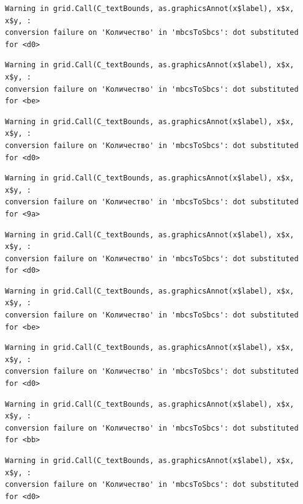 \documentclass[
  letterpaper,
  DIV=11,
  numbers=noendperiod]{scrreprt}
\theoremstyle{definition}
\theoremstyle{remark}
\begin{document}
\begin{verbatim}
Warning in grid.Call(C_textBounds, as.graphicsAnnot(x$label), x$x, x$y, :
conversion failure on 'Количество' in 'mbcsToSbcs': dot substituted for <d0>
\end{verbatim}

\begin{verbatim}
Warning in grid.Call(C_textBounds, as.graphicsAnnot(x$label), x$x, x$y, :
conversion failure on 'Количество' in 'mbcsToSbcs': dot substituted for <be>
\end{verbatim}

\begin{verbatim}
Warning in grid.Call(C_textBounds, as.graphicsAnnot(x$label), x$x, x$y, :
conversion failure on 'Количество' in 'mbcsToSbcs': dot substituted for <d0>
\end{verbatim}

\begin{verbatim}
Warning in grid.Call(C_textBounds, as.graphicsAnnot(x$label), x$x, x$y, :
conversion failure on 'Количество' in 'mbcsToSbcs': dot substituted for <9a>
\end{verbatim}

\begin{verbatim}
Warning in grid.Call(C_textBounds, as.graphicsAnnot(x$label), x$x, x$y, :
conversion failure on 'Количество' in 'mbcsToSbcs': dot substituted for <d0>
\end{verbatim}

\begin{verbatim}
Warning in grid.Call(C_textBounds, as.graphicsAnnot(x$label), x$x, x$y, :
conversion failure on 'Количество' in 'mbcsToSbcs': dot substituted for <be>
\end{verbatim}

\begin{verbatim}
Warning in grid.Call(C_textBounds, as.graphicsAnnot(x$label), x$x, x$y, :
conversion failure on 'Количество' in 'mbcsToSbcs': dot substituted for <d0>
\end{verbatim}

\begin{verbatim}
Warning in grid.Call(C_textBounds, as.graphicsAnnot(x$label), x$x, x$y, :
conversion failure on 'Количество' in 'mbcsToSbcs': dot substituted for <bb>
\end{verbatim}

\begin{verbatim}
Warning in grid.Call(C_textBounds, as.graphicsAnnot(x$label), x$x, x$y, :
conversion failure on 'Количество' in 'mbcsToSbcs': dot substituted for <d0>
\end{verbatim}
\end{document}
